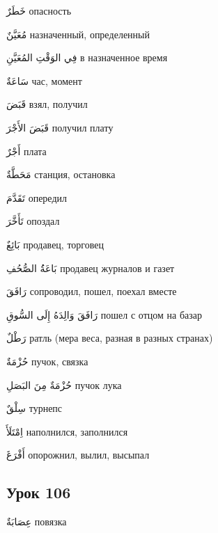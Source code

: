 \documentclass[a5paper]{article}
\newcommand\textstyleDropCaps[1]{#1}
\newcommand\textstyleCaptioncharacters[1]{#1}
\begin{document}
\textstyleCaptioncharacters{خَطَرٌ }\textstyleDropCaps{опасность‎}

\textstyleCaptioncharacters{مُعَيَّنٌ }\textstyleDropCaps{назначенный, опре­деленный‎}

\textstyleCaptioncharacters{فِي الوَقْتِ المُعَيَّنِ }\textstyleDropCaps{в назначенное время‎}

\textstyleCaptioncharacters{سَاعَةٌ }\textstyleDropCaps{час, момент‎}

\textstyleCaptioncharacters{قَبَضَ }\textstyleDropCaps{взял, получил‎}

\textstyleCaptioncharacters{قَبَضَ الأَجْرَ }\textstyleDropCaps{получил плату‎}

\textstyleCaptioncharacters{أَجْرٌ }\textstyleDropCaps{плата‎}

\textstyleCaptioncharacters{مَحَطَّةٌ }\textstyleDropCaps{станция, останов­ка‎}

\textstyleCaptioncharacters{تَقَدَّمَ }\textstyleDropCaps{опередил‎}

\textstyleCaptioncharacters{تَأَخَّرَ }\textstyleDropCaps{опоздал‎}

\textstyleCaptioncharacters{بَائِعٌ }\textstyleDropCaps{продавец, торговец‎}

\textstyleCaptioncharacters{بَاعَةُُ الصُّحُفِ }\textstyleDropCaps{продавец журналов и газет‎}

\textstyleCaptioncharacters{رَافَقَ }\textstyleDropCaps{сопроводил, пошел, поехал вместе‎}

\textstyleCaptioncharacters{رَافَقَ وَالِدَهُ إِلَى السُّوقِ }\textstyleDropCaps{пошел с отцом на базар ‎}

\textstyleCaptioncharacters{رَطْلٌ }\textstyleDropCaps{ратль (мера веса, разная в разных странах)‎}

\textstyleCaptioncharacters{حُزْمَةٌ }\textstyleDropCaps{пучок, связка‎}

\textstyleCaptioncharacters{حُزْمَةٌ مِنَ البَصَلِ }\textstyleDropCaps{пу­чок лука‎}

\textstyleCaptioncharacters{سِلْقٌ }\textstyleDropCaps{турнепс‎}

\textstyleCaptioncharacters{اِمْتَلَأَ }\textstyleDropCaps{наполнился, запол­нился‎}

\textstyleCaptioncharacters{أَفْرَغَ }\textstyleDropCaps{опорожнил, вылил, высыпал‎}

\subsection[Урок 106‎]{\textstyleDropCaps{Урок 106‎}}
\textstyleCaptioncharacters{عِصَابَةٌ }\textstyleDropCaps{повязка‎}
\end{document}

